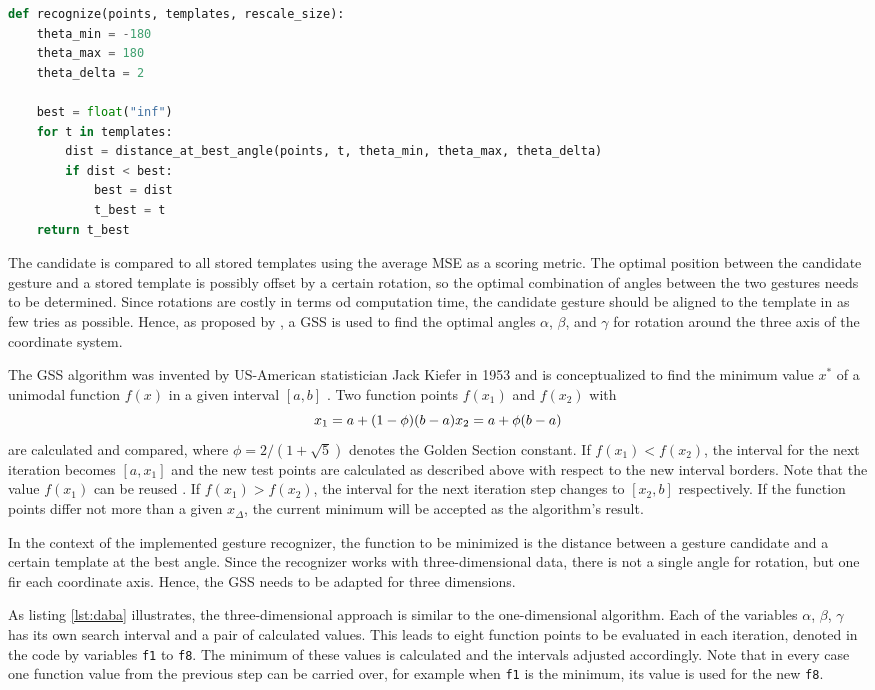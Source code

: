 \begin{lstlisting}[label=lst:recognize,language=python,frame=lt,caption=Matching candidate gesture against every template]
def recognize(points, templates, rescale_size):
	theta_min = -180
	theta_max = 180
	theta_delta = 2

	best = float("inf")
	for t in templates:
		dist = distance_at_best_angle(points, t, theta_min, theta_max, theta_delta)
		if dist < best:
			best = dist
			t_best = t
	return t_best
\end{lstlisting}

The candidate is compared to all stored templates using the average \ac{MSE} as a scoring metric. The optimal position between the candidate gesture and a stored template is possibly offset by a certain rotation, so the optimal combination of angles between the two gestures needs to be determined. Since rotations are costly in terms od computation time, the candidate gesture should be aligned to the template in as few tries as possible. Hence, as proposed by \cite{Kratz2010}, a \ac{GSS} is used to find the optimal angles $\alpha$, $\beta$, and $\gamma$ for rotation around the three axis of the coordinate system.

The \ac{GSS} algorithm was invented by US-American statistician Jack Kiefer in 1953  and is conceptualized to find the minimum value $x^*$ of a unimodal function $f(x)$ in a given interval $[a,b]$ \cite{Kiefer1953}. Two function points $f(x_1)$ and $f(x_2)$ with 
\[ x_1=a+(1-\phi)(b-a) \\
x_2=a+\phi(b-a) \]
are calculated and compared, where $\phi=2/(1+\sqrt{5})$ denotes the Golden Section constant. If $f(x_1) < f(x_2)$, the interval for the next iteration becomes $[a,x_1]$ and the new test points are calculated as described above with respect to the new interval borders. Note that the value $f(x_1)$ can be reused \cite{chang2009n}. If $f(x_1) > f(x_2)$, the interval for the next iteration step changes to $[x_2, b]$ respectively. If the function points differ not more than a given $x_\Delta$, the current minimum will be accepted as the algorithm's result.

In the context of the implemented gesture recognizer, the function to be minimized is the distance between a gesture candidate and a certain template at the best angle. Since the recognizer works with three-dimensional data, there is not a single angle for rotation, but one fir each coordinate axis. Hence, the \ac{GSS} needs to be adapted for three dimensions.

As listing \ref{lst:daba} illustrates, the three-dimensional approach is similar to the one-dimensional algorithm. Each of the variables $\alpha$, $ \beta $, $ \gamma $ has its own search interval and a pair of calculated values. This leads to eight function points to be evaluated in each iteration, denoted in the code by variables \texttt{f1} to \texttt{f8}. The minimum of these values is calculated and the intervals adjusted accordingly. Note that in every case one function value from the previous step can be carried over, for example when \texttt{f1} is the minimum, its value is used for the new \texttt{f8}.

